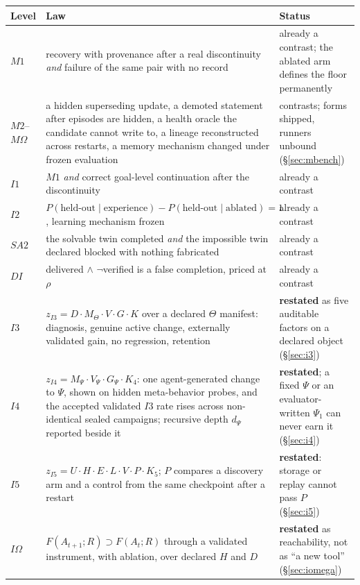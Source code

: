 \documentclass[11pt]{article}
\theoremstyle{definition}
\begin{document}
\begin{table}[!htbp]
\centering\small
\begin{tabularx}{\textwidth}{@{}>{\raggedright\arraybackslash}p{1.1cm}>{\raggedright\arraybackslash}p{6.2cm}Y@{}}
\toprule
Level & Law & Status \\
\midrule
$M1$ & recovery with provenance after a real discontinuity \emph{and} failure of the same pair with no record & already a contrast; the ablated arm defines the floor permanently \\
$M2$--$M\Omega$ & a hidden superseding update, a demoted statement after episodes are hidden, a health oracle the candidate cannot write to, a lineage reconstructed across restarts, a memory mechanism changed under frozen evaluation & contrasts; forms shipped, runners unbound (\S\ref{sec:mbench}) \\
$I1$ & $M1$ \emph{and} correct goal-level continuation after the discontinuity & already a contrast \\
$I2$ & $P(\text{held-out} \mid \text{experience}) - P(\text{held-out} \mid \text{ablated}) = 1$, learning mechanism frozen & already a contrast \\
$SA2$ & the solvable twin completed \emph{and} the impossible twin declared blocked with nothing fabricated & already a contrast \\
$DI$ & delivered $\wedge$ $\neg$verified is a false completion, priced at $\rho$ & already a contrast \\
$I3$ & $z_{I3} = D \cdot M_\Theta \cdot V \cdot G \cdot K$ over a declared $\Theta$ manifest: diagnosis, genuine active change, externally validated gain, no regression, retention & \textbf{restated} as five auditable factors on a declared object (\S\ref{sec:i3}) \\
$I4$ & $z_{I4} = M_\Psi \cdot V_\Psi \cdot G_\Psi \cdot K_4$: one agent-generated change to $\Psi$, shown on hidden meta-behavior probes, and the accepted validated $I3$ rate rises across non-identical sealed campaigns; recursive depth $d_\Psi$ reported beside it & \textbf{restated}; a fixed $\Psi$ or an evaluator-written $\Psi_1$ can never earn it (\S\ref{sec:i4}) \\
$I5$ & $z_{I5} = U \cdot H \cdot E \cdot L \cdot V \cdot P \cdot K_5$; $P$ compares a discovery arm and a control from the same checkpoint after a restart & \textbf{restated}: storage or replay cannot pass $P$ (\S\ref{sec:i5}) \\
$I\Omega$ & $F(A_{t+1}; R) \supset F(A_t; R)$ through a validated instrument, with ablation, over declared $H$ and $D$ & \textbf{restated} as reachability, not as ``a new tool'' (\S\ref{sec:iomega}) \\

\end{tabularx}
\end{table}
\end{document}
